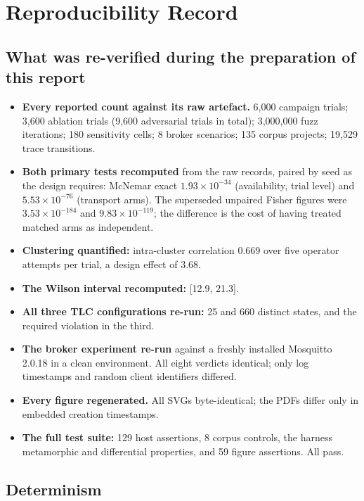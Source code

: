 \chapter{Reproducibility Record}\label{app:repro}

\section{What was re-verified during the preparation of this report}

\begin{itemize}[leftmargin=1.6em,itemsep=4pt]
  \item \textbf{Every reported count against its raw artefact.} 6,000 campaign trials; 3,600
        ablation trials (9,600 adversarial trials in total); 3,000,000 fuzz iterations; 180
        sensitivity cells; 8 broker scenarios; 135 corpus projects; 19,529 trace transitions.
  \item \textbf{Both primary tests recomputed} from the raw records, paired by seed as the
        design requires: McNemar exact $1.93\times10^{-34}$ (availability, trial level) and
        $5.53\times10^{-76}$ (transport arms). The superseded unpaired Fisher figures were
        $3.53\times10^{-184}$ and $9.83\times10^{-119}$; the difference is the cost of having
        treated matched arms as independent.
  \item \textbf{Clustering quantified:} intra-cluster correlation 0.669 over five operator
        attempts per trial, a design effect of 3.68.
  \item \textbf{The Wilson interval recomputed:} [12.9, 21.3].
  \item \textbf{All three TLC configurations re-run:} 25 and 660 distinct states, and the
        required violation in the third.
  \item \textbf{The broker experiment re-run} against a freshly installed Mosquitto 2.0.18 in a
        clean environment. All eight verdicts identical; only log timestamps and random client
        identifiers differed.
  \item \textbf{Every figure regenerated.} All SVGs byte-identical; the PDFs differ only in
        embedded creation timestamps.
  \item \textbf{The full test suite:} 129 host assertions, 8 corpus controls, the harness
        metamorphic and differential properties, and 59 figure assertions. All pass.
\end{itemize}

\section{Determinism}

